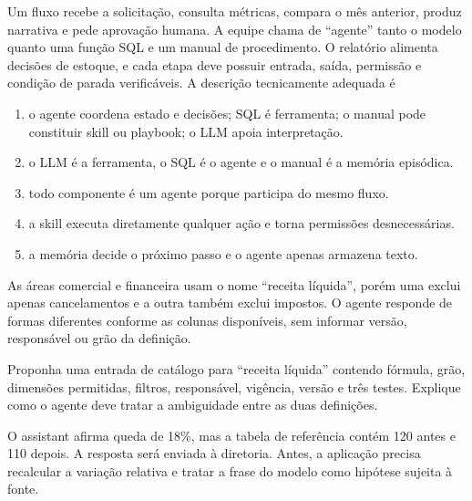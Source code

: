 \documentclass[12pt,a4paper]{article}
\begin{document}
\TextoBase
Um fluxo recebe a solicitação, consulta métricas, compara o mês anterior, produz narrativa e pede aprovação humana. A equipe chama de ``agente'' tanto o modelo quanto uma função SQL e um manual de procedimento.
O relatório alimenta decisões de estoque, e cada etapa deve possuir entrada, saída, permissão e condição de parada verificáveis.
\FonteDidatica
\Comando A descrição tecnicamente adequada é
\begin{enumerate}[label=\Alph*)]
  \item o agente coordena estado e decisões; SQL é ferramenta; o manual pode constituir skill ou playbook; o LLM apoia interpretação.
  \item o LLM é a ferramenta, o SQL é o agente e o manual é a memória episódica.
  \item todo componente é um agente porque participa do mesmo fluxo.
  \item a skill executa diretamente qualquer ação e torna permissões desnecessárias.
  \item a memória decide o próximo passo e o agente apenas armazena texto.
\end{enumerate}


\TextoBase

As áreas comercial e financeira usam o nome ``receita líquida'', porém uma exclui apenas cancelamentos e a outra também exclui impostos. O agente responde de formas diferentes conforme as colunas disponíveis, sem informar versão, responsável ou grão da definição.

\FonteDidatica

\Comando Proponha uma entrada de catálogo para ``receita líquida'' contendo fórmula, grão, dimensões permitidas, filtros, responsável, vigência, versão e três testes. Explique como o agente deve tratar a ambiguidade entre as duas definições.
\EspacoDiscursiva


\TextoBase

O assistant afirma queda de 18\%, mas a tabela de referência contém 120 antes e 110 depois. A resposta será enviada à diretoria. Antes, a aplicação precisa recalcular a variação relativa e tratar a frase do modelo como hipótese sujeita à fonte.
\end{document}
